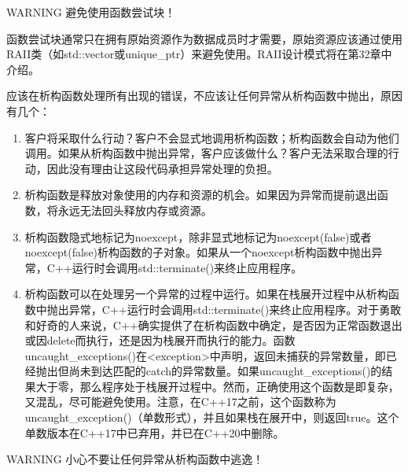 \begin{myWarning}{WARNING}
避免使用函数尝试块！

函数尝试块通常只在拥有原始资源作为数据成员时才需要，原始资源应该通过使用RAII类（如std::vector或unique\_ptr）来避免使用。RAII设计模式将在第32章中介绍。
\end{myWarning}


应该在析构函数处理所有出现的错误，不应该让任何异常从析构函数中抛出，原因有几个：

\begin{enumerate}
\item
客户将采取什么行动？客户不会显式地调用析构函数；析构函数会自动为他们调用。如果从析构函数中抛出异常，客户应该做什么？客户无法采取合理的行动，因此没有理由让这段代码承担异常处理的负担。

\item
析构函数是释放对象使用的内存和资源的机会。如果因为异常而提前退出函数，将永远无法回头释放内存或资源。

\item
析构函数隐式地标记为noexcept，除非显式地标记为noexcept(false)或者noexcept(false)析构函数的子对象。如果从一个noexcept析构函数中抛出异常，C++运行时会调用std::terminate()来终止应用程序。

\item
析构函数可以在处理另一个异常的过程中运行。如果在栈展开过程中从析构函数中抛出异常，C++运行时会调用std::terminate()来终止应用程序。对于勇敢和好奇的人来说，C++确实提供了在析构函数中确定，是否因为正常函数退出或因delete而执行，还是因为栈展开而执行的能力。函数uncaught\_exceptions()在<exception>中声明，返回未捕获的异常数量，即已经抛出但尚未到达匹配的catch的异常数量。如果uncaught\_exceptions()的结果大于零，那么程序处于栈展开过程中。然而，正确使用这个函数是即复杂，又混乱，尽可能避免使用。注意，在C++17之前，这个函数称为uncaught\_exception()（单数形式），并且如果栈在展开中，则返回true。这个单数版本在C++17中已弃用，并已在C++20中删除。
\end{enumerate}

\begin{myWarning}{WARNING}
小心不要让任何异常从析构函数中逃逸！
\end{myWarning}
















